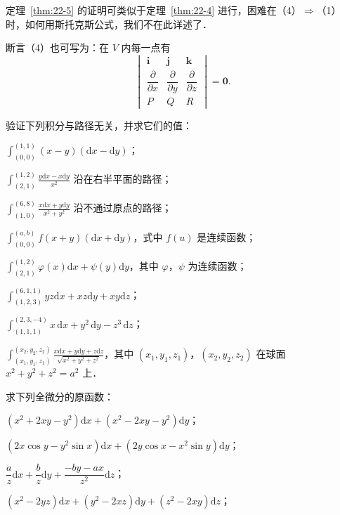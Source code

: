 定理~\ref{thm:22-5} 的证明可类似于定理~\ref{thm:22-4} 进行，困难在（4）$\Rightarrow$（1）时，如何用斯托克斯公式，我们不在此详述了．

断言（4）也可写为：在 $V$ 内每一点有
\[
\begin{vmatrix}\bm{i}&\bm{j}&\bm{k}\\[3pt]\dfrac{\partial}{\partial x}&\dfrac{\partial}{\partial y}&\dfrac{\partial}{\partial z}\\[3pt] P&Q&R\end{vmatrix}=\bm{0}.
\]

\begin{xiti}
\item 验证下列积分与路径无关，并求它们的值：
\begin{ziti}
\item $\displaystyle\int_{(0,0)}^{(1,1)}(x-y)(\mathrm{d}x-\mathrm{d}y)$；
\item $\displaystyle\int_{(2,1)}^{(1,2)}\frac{y\mathrm{d}x-x\mathrm{d}y}{x^{2}}$ 沿在右半平面的路径；
\item $\displaystyle\int_{(1,0)}^{(6,8)}\frac{x\mathrm{d}x+y\mathrm{d}y}{x^{2}+y^{2}}$ 沿不通过原点的路径；
\item $\displaystyle\int_{(0,0)}^{(a,b)}f(x+y)(\mathrm{d}x+\mathrm{d}y)$，式中 $f(u)$ 是连续函数；
\item $\displaystyle\int_{(2,1)}^{(1,2)}\varphi(x)\mathrm{d}x+\psi(y)\mathrm{d}y$，其中 $\varphi$，$\psi$ 为连续函数；
\item $\displaystyle\int_{(1,2,3)}^{(6,1,1)}yz\mathrm{d}x+xz\mathrm{d}y+xy\mathrm{d}z$；
\item $\displaystyle\int_{(1,1,1)}^{(2,3,-4)}x\,\mathrm{d}x+y^{2}\,\mathrm{d}y-z^{3}\,\mathrm{d}z$；
\item $\displaystyle\int_{(x_{1},y_{1},z_{1})}^{(x_{2},y_{2},z_{2})}\frac{x\mathrm{d}x+y\mathrm{d}y+z\mathrm{d}z}{\sqrt{x^{2}+y^{2}+z^{2}}}$，其中 $(x_{1},y_{1},z_{1})$，$(x_{2},y_{2},z_{2})$ 在球面 $x^{2}+y^{2}+z^{2}=a^{2}$ 上．
\end{ziti}
\item 求下列全微分的原函数：
\begin{ziti}
\item $\left(x^{2}+2xy-y^{2}\right)\mathrm{d}x+\left(x^{2}-2xy-y^{2}\right)\mathrm{d}y$；
\item $\left(2x\cos y-y^{2}\sin x\right)\mathrm{d}x+\left(2y\cos x-x^{2}\sin y\right)\mathrm{d}y$；
\item $\dfrac{a}{z}\mathrm{d}x+\dfrac{b}{z}\mathrm{d}y+\dfrac{-by-ax}{z^{2}}\mathrm{d}z$；
\item $\left(x^{2}-2yz\right)\mathrm{d}x+\left(y^{2}-2xz\right)\mathrm{d}y+\left(z^{2}-2xy\right)\mathrm{d}z$；

\end{ziti}
\end{xiti}
